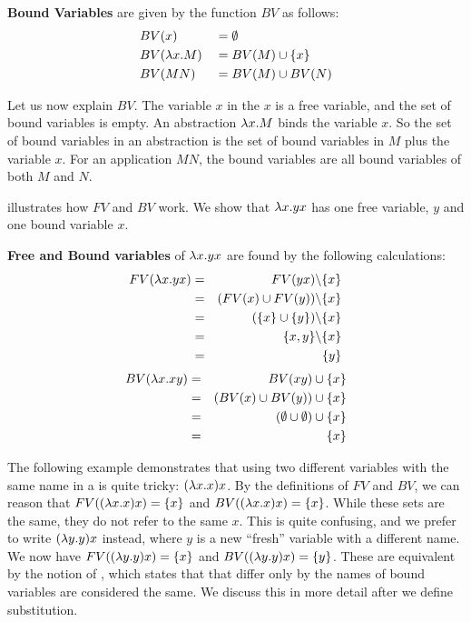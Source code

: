 \begin{definition}
  \label{def:bound-variable}
  \textbf{Bound Variables} are given by the function $BV$ as follows:  \\
  \[
    \begin{aligned}
      & BV(x)           & &= \emptyset \\
      & BV(\lambda {x}.{M}) & &= BV(M) \cup \{x\} \\
      & BV(M N)         & &= BV(M) \cup BV(N)
    \end{aligned}
    \]
  \end{definition}
Let us now explain $BV$.
The variable $x$ in the \lterm $x$ is a free variable, and the set of bound variables is empty.
An abstraction $\lambda {x}.{M}$ binds the variable $x$. So the set of bound variables in an abstraction is the set of bound variables in $M$ plus the variable $x$.
For an application $M N$, the bound variables are all bound variables of both \lterm $M$ and \lterm $N$.
  
 illustrates how $FV$ and $BV$ work.
We show that \lterm $\lambda {x}.{yx}$ has one free variable, $y$ and one bound variable $x$.
\begin{example}
  \label{ex:free-bound-variable}
  \textbf{Free and Bound variables} of \lterm $\lambda {x}.{yx}$ are found by the following calculations:
  \begin{eqnarray*}
 FV(\lambda {x}.{yx}) &=& FV(y x) \backslash \{x\} \\
    &=& (FV(x) \cup FV(y)) \backslash \{x\} \\
    &=& (\{x\} \cup \{y\}) \backslash \{x\} \\
    &=& \{x, y\} \backslash \{x\} \\
    &=& \{y\}
  \end{eqnarray*}
  \begin{eqnarray*}
 BV(\lambda {x}.{xy}) &=& BV(xy) \cup \{x\} \\
    &=& (BV(x) \cup BV(y)) \cup \{x\} \\
    &=& (\emptyset \cup \emptyset) \cup \{x\} \\
    &=& \{x\}
  \end{eqnarray*}
\end{example}


The following example demonstrates that using two different variables with the same name in a \lterm is quite tricky: $(\lambda {x}.{x})x$.
By the definitions of $FV$ and $BV$, we can reason that $FV((\lambda {x}.{x})x) = \{x\}$ and $BV((\lambda {x}.{x})x) = \{x\}$.
While these sets are the same, they do not refer to the same $x$.
This is quite confusing, and we prefer to write $(\lambda {y}.{y})x$ instead, where $y$ is a new ``fresh'' variable with a different name.
We now have $FV((\lambda {y}.{y})x) = \{x\}$ and $BV((\lambda {y}.{y})x) = \{y\}$.
These \lterms are equivalent by the notion of \aeq, which states that \lterms that differ only by the names of bound variables are considered the same.
We discuss this in more detail after we define substitution.

